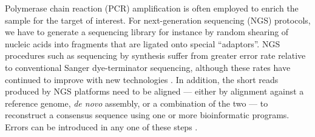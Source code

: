 \documentclass[10pt]{article}
\begin{document}
Polymerase chain reaction (PCR) amplification is often employed to enrich the sample for the target of interest.
For next-generation sequencing (NGS) protocols, we have to generate a sequencing library for instance by random shearing of nucleic acids into fragments that are ligated onto special ``adaptors''.
NGS procedures such as sequencing by synthesis suffer from greater error rate relative to conventional Sanger dye-terminator sequencing, although these rates have continued to improve with new technologies \citep{fullerChallengesSequencingSynthesis2009}.
In addition, the short reads produced by NGS platforms need to be aligned --- either by alignment against a reference genome, \emph{de novo} assembly, or a combination of the two --- to reconstruct a consensus sequence using one or more bioinformatic programs.
Errors can be introduced in any one of these steps \citep{beerenwinkelUltradeepSequencingAnalysis2011, oraweAccountingUncertaintyDNA2015}.
\end{document}
